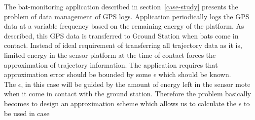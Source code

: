\documentclass[conference]{IEEEtran}
\begin{document}
The bat-monitoring application described in section~\ref{case-study} presents the problem of data management of GPS logs. Application periodically logs the GPS data at a variable frequency based on the remaining energy of the platform. As described, this GPS data is transferred to Ground Station when bats come in contact. Instead of ideal requirement of transferring all trajectory data as it is, limited energy in the sensor platform at the time of contact forces the approximation of trajectory information. The application requires that approximation error should be bounded by some $\epsilon$ which should be known.\\
The $\epsilon$, in this case will be guided by the amount of energy left in the sensor mote when it come in contact with the ground station. Therefore the problem basically becomes to design an approximation scheme which allows us to calculate the $\epsilon$ to be used in case 

\end{document}
